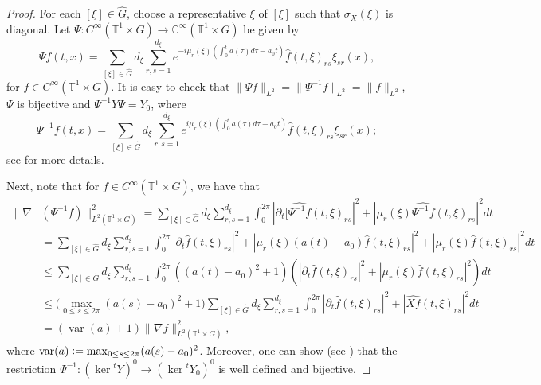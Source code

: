 \documentclass[11pt]{amsart}
\numberwithin{theorem}{section}
\numberwithin{equation}{section}
\theoremstyle{definition}
\numberwithin{example}{section}
\theoremstyle{definition}
\theoremstyle{definition}
\newcommand{\T}{\mathbb{T}}
\newcommand{\C}{\mathbb{C}}
\begin{document}
\begin{proof}
For each $[\xi]\in\widehat{G}$, choose a representative $\xi$ of $[\xi]$ such that $\sigma_X(\xi)$ is diagonal. Let $\Psi:C^\infty(\T^1\times G)\to \C^\infty(\T^1\times G)$ be given by
\begin{equation*}
    \Psi f(t,x)=\sum_{[\xi]\in\widehat{G}}d_\xi \sum_{r,s=1}^{d_\xi} e^{-i\mu_r(\xi)(\int_0^t a(\tau)d\tau-a_0t)}\widehat{f}(t,\xi)_{rs}\xi_{sr}(x),
\end{equation*}
for $f\in C^\infty(\T^1\times G)$.
 It is easy to check that  $\|\Psi f\|_{L^2}=\|\Psi^{-1} f\|_{L^2}=\|f\|_{L^2}$, $\Psi$ is bijective and $\Psi^{-1}Y\Psi =Y_0$, where
 \begin{equation*}
    \Psi^{-1} f(t,x)=\sum_{[\xi]\in\widehat{G}}d_\xi \sum_{r,s=1}^{d_\xi} e^{i\mu_r(\xi)(\int_0^t a(\tau)d\tau-a_0t)}\widehat{f}(t,\xi)_{rs}\xi_{sr}(x);
\end{equation*}
 see \cite{KWR_product} for more details. 

 Next, note that for $f\in C^\infty(\T^1\times G)$, we have that 
\begin{align*}
    \|\nabla &(\Psi^{-1} f)\|_{L^2(\T^1\times G)}^2=\sum_{[\xi]\in\widehat{G}}d_\xi\sum_{r,s=1}^{d_\xi}\int_0^{2\pi}|\partial_t[\widehat{\Psi^{-1}f}(t,\xi)_{rs}|^2+|\mu_r(\xi)\widehat{\Psi^{-1}f}(t,\xi)_{rs}|^2dt\\
    &=\sum_{[\xi]\in\widehat{G}}d_\xi\sum_{r,s=1}^{d_\xi}\int_0^{2\pi} |\partial_t\widehat{f}(t,\xi)_{rs}|^2+|\mu_{r}(\xi)(a(t)-a_0)\widehat{f}(t,\xi)_{rs}|^2+|\mu_{r}(\xi)\widehat{f}(t,\xi)_{rs}|^2dt\\
    &\leq \sum_{[\xi]\in\widehat{G}}d_\xi\sum_{r,s=1}^{d_\xi}\int_0^{2\pi}((a(t)-a_0)^2+1)(|\partial_t\widehat{f}(t,\xi)_{rs}|^2+|\mu_{r}(\xi)\widehat{f}(t,\xi)_{rs}|^2)dt\\
    &\leq \Big(\max_{0\leq s\leq 2\pi}(a(s)-a_0)^2+1\Big)\sum_{[\xi]\in\widehat{G}}d_\xi\sum_{r,s=1}^{d_\xi}\int_0^{2\pi}|\partial_t\widehat{f}(t,\xi)_{rs}|^2+|\widehat{Xf}(t,\xi)_{rs}|^2dt\\
    &=(\operatorname{var}(a)+1)\|\nabla f\|_{L^2(\T^1\times G)}^2,
\end{align*}
where $\operatorname{var}(a)\vcentcolon=\max_{0\leq s\leq 2\pi}(a(s)-a_0)^2$. Moreover, one can show (see  \cite[proof of Proposition 5.1.2]{Kow_thesis}) that the restriction $\Psi^{-1}:(\ker {}^tY)^0\to (\ker {}^tY_0)^0$ is well defined and bijective. 


\end{proof}
\end{document}
